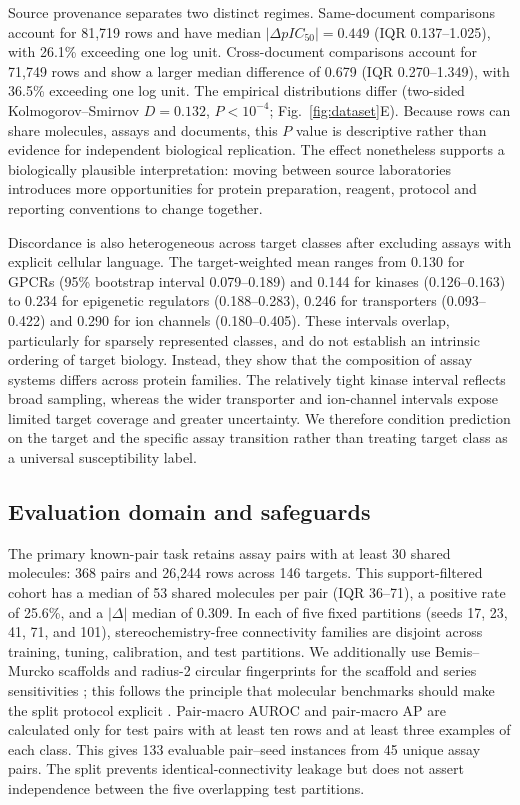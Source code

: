 \documentclass[letterpaper]{article}
\begin{document}
Source provenance separates two distinct regimes. Same-document comparisons account for 81,719 rows and have median $|\Delta pIC_{50}|=0.449$ (IQR 0.137--1.025), with 26.1\% exceeding one log unit. Cross-document comparisons account for 71,749 rows and show a larger median difference of 0.679 (IQR 0.270--1.349), with 36.5\% exceeding one log unit. The empirical distributions differ (two-sided Kolmogorov--Smirnov $D=0.132$, $P<10^{-4}$; Fig.~\ref{fig:dataset}E). Because rows can share molecules, assays and documents, this $P$ value is descriptive rather than evidence for independent biological replication. The effect nonetheless supports a biologically plausible interpretation: moving between source laboratories introduces more opportunities for protein preparation, reagent, protocol and reporting conventions to change together.

Discordance is also heterogeneous across target classes after excluding assays with explicit cellular language. The target-weighted mean ranges from 0.130 for GPCRs (95\% bootstrap interval 0.079--0.189) and 0.144 for kinases (0.126--0.163) to 0.234 for epigenetic regulators (0.188--0.283), 0.246 for transporters (0.093--0.422) and 0.290 for ion channels (0.180--0.405). These intervals overlap, particularly for sparsely represented classes, and do not establish an intrinsic ordering of target biology. Instead, they show that the composition of assay systems differs across protein families. The relatively tight kinase interval reflects broad sampling, whereas the wider transporter and ion-channel intervals expose limited target coverage and greater uncertainty. We therefore condition prediction on the target and the specific assay transition rather than treating target class as a universal susceptibility label.

\subsection{Evaluation domain and safeguards}

The primary known-pair task retains assay pairs with at least 30 shared molecules: 368 pairs and 26,244 rows across 146 targets. This support-filtered cohort has a median of 53 shared molecules per pair (IQR 36--71), a positive rate of 25.6\%, and a $|\Delta|$ median of 0.309. In each of five fixed partitions (seeds 17, 23, 41, 71, and 101), stereochemistry-free connectivity families are disjoint across training, tuning, calibration, and test partitions. We additionally use Bemis--Murcko scaffolds and radius-2 circular fingerprints for the scaffold and series sensitivities \citep{murcko1996,rogers2010ecfp}; this follows the principle that molecular benchmarks should make the split protocol explicit \citep{wu2018moleculenet}. Pair-macro AUROC and pair-macro AP are calculated only for test pairs with at least ten rows and at least three examples of each class. This gives 133 evaluable pair--seed instances from 45 unique assay pairs. The split prevents identical-connectivity leakage but does not assert independence between the five overlapping test partitions.
\end{document}
